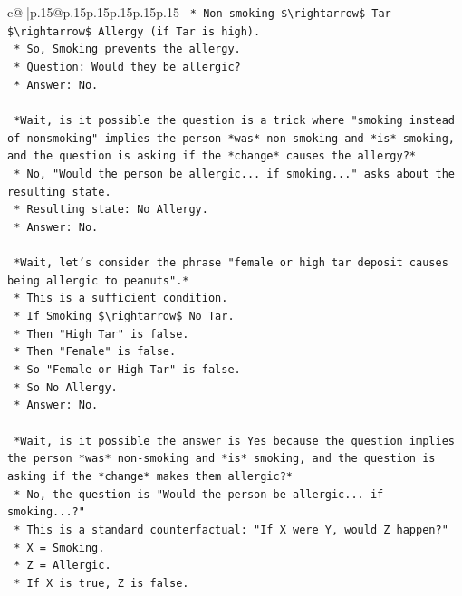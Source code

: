 \documentclass{article}
\begin{document}
{\begin{supertabular}{c@{$\;$}|p{.15\linewidth}@{}p{.15\linewidth}p{.15\linewidth}p{.15\linewidth}p{.15\linewidth}p{.15\linewidth}}
{{{\texttt{    *   Non{-}smoking \$\textbackslash{}rightarrow\$ Tar \$\textbackslash{}rightarrow\$ Allergy (if Tar is high).} \\
\texttt{    *   So, Smoking prevents the allergy.} \\
\texttt{    *   Question: Would they be allergic?} \\
\texttt{    *   Answer: No.} \\
\\ 
\texttt{    *Wait, is it possible the question is a trick where "smoking instead of nonsmoking" implies the person *was* non{-}smoking and *is* smoking, and the question is asking if the *change* causes the allergy?*} \\
\texttt{    *   No, "Would the person be allergic... if smoking..." asks about the resulting state.} \\
\texttt{    *   Resulting state: No Allergy.} \\
\texttt{    *   Answer: No.} \\
\\ 
\texttt{    *Wait, let's consider the phrase "female or high tar deposit causes being allergic to peanuts".*} \\
\texttt{    *   This is a sufficient condition.} \\
\texttt{    *   If Smoking \$\textbackslash{}rightarrow\$ No Tar.} \\
\texttt{    *   Then "High Tar" is false.} \\
\texttt{    *   Then "Female" is false.} \\
\texttt{    *   So "Female or High Tar" is false.} \\
\texttt{    *   So No Allergy.} \\
\texttt{    *   Answer: No.} \\
\\ 
\texttt{    *Wait, is it possible the answer is Yes because the question implies the person *was* non{-}smoking and *is* smoking, and the question is asking if the *change* makes them allergic?*} \\
\texttt{    *   No, the question is "Would the person be allergic... if smoking...?"} \\
\texttt{    *   This is a standard counterfactual: "If X were Y, would Z happen?"} \\
\texttt{    *   X = Smoking.} \\
\texttt{    *   Z = Allergic.} \\
\texttt{    *   If X is true, Z is false.} \\
}}}
\end{supertabular}}
\end{document}
